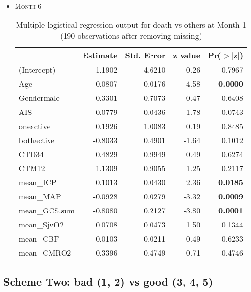 \documentclass{article}
\begin{document}
\begin{itemize}
\item \textsc{Month 6}
\begin{table}[H]
\centering
\begin{tabular}{lrrrr}
  \hline
 & Estimate & Std. Error & z value & Pr($>$$|$z$|$) \\ 
  \hline
(Intercept) & -1.1902 & 4.6210 & -0.26 & 0.7967 \\ 
  Age & 0.0807 & 0.0176 & 4.58 & {\bf 0.0000} \\ 
  Gendermale & 0.3301 & 0.7073 & 0.47 & 0.6408 \\ 
  AIS & 0.0779 & 0.0436 & 1.78 & 0.0743 \\ 
  oneactive & 0.1926 & 1.0083 & 0.19 & 0.8485 \\ 
  bothactive & -0.8033 & 0.4901 & -1.64 & 0.1012 \\ 
  CTD34 & 0.4829 & 0.9949 & 0.49 & 0.6274 \\ 
  CTM12 & 1.1309 & 0.9055 & 1.25 & 0.2117 \\ 
  mean\_ICP & 0.1013 & 0.0430 & 2.36 & {\bf 0.0185} \\ 
  mean\_MAP & -0.0928 & 0.0279 & -3.32 & {\bf 0.0009} \\ 
  mean\_GCS.sum & -0.8080 & 0.2127 & -3.80 & {\bf 0.0001} \\ 
  mean\_SjvO2 & 0.0708 & 0.0473 & 1.50 & 0.1344 \\ 
  mean\_CBF & -0.0103 & 0.0211 & -0.49 & 0.6233 \\ 
  mean\_CMRO2 & 0.3396 & 0.4749 & 0.71 & 0.4746 \\ 
   \hline
\end{tabular}
\caption{Multiple logistical regression output for death vs others at Month 1 (190 observations after removing missing)}
\end{table}

\end{itemize}




\newpage
\subsection{Scheme Two: bad (1, 2) vs good (3, 4, 5)}
\end{document}
